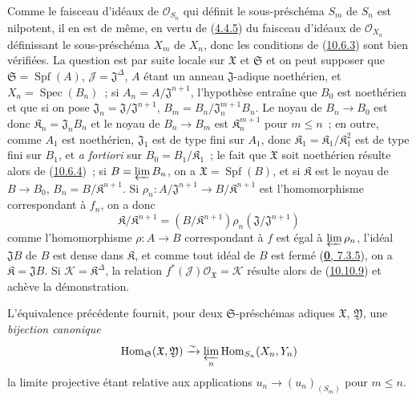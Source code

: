 Comme le faisceau d'idéaux de $\mathscr{O}_{S_n}$ qui définit le
sous-préschéma $S_m$ de $S_n$ est nilpotent, il en est de même, en vertu de
(\hyperref[I.4.4.5-fr]{4.4.5}) du faisceau d'idéaux de
$\mathscr{O}_{X_n}$ définissant le sous-préschéma $X_m$ de $X_n$, donc les
conditions de (\hyperref[I.10.6.3-fr]{10.6.3}) sont bien vérifiées. La
question est par suite locale sur $\mathfrak{X}$ et $\mathfrak{S}$ et on
peut supposer que $\mathfrak{S}=\operatorname{Spf}(A)$,
$\mathscr{J}=\mathfrak{J}^\Delta$, $A$ étant un anneau $\mathfrak{J}$-adique
noethérien, et $X_n=\operatorname{Spec}(B_n)$~; si
$A_n=A/\mathfrak{J}^{n+1}$, l'hypothèse entraîne que $B_0$ est noethérien et
que si on pose $\mathfrak{J}_n=\mathfrak{J}/\mathfrak{J}^{n+1}$,
$B_m=B_n/\mathfrak{J}_n^{m+1}B_n$. Le noyau de $B_n\to B_0$ est donc
$\mathfrak{K}_n=\mathfrak{J}_nB_n$ et le noyau de $B_n\to B_m$ est
$\mathfrak{K}_n^{m+1}$ pour $m\leq n$~; en outre, comme $A_1$ est
noethérien, $\mathfrak{J}_1$ est de type fini sur $A_1$, donc
$\mathfrak{K}_1=\mathfrak{K}_1/\mathfrak{K}_1^2$ est de type fini
sur $B_1$, et \emph{a fortiori} sur
$B_0=B_1/\mathfrak{K}_1$~; le fait que $\mathfrak{X}$ soit noethérien
résulte alors de (\hyperref[I.10.6.4-fr]{10.6.4})~; si
$B=\varprojlim B_n$, on a $\mathfrak{X}=\operatorname{Spf}(B)$, et si
$\mathfrak{K}$ est le noyau de $B\to B_0$,
$B_n=B/\mathfrak{K}^{n+1}$. Si
$\rho_n:A/\mathfrak{J}^{n+1}\to B/\mathfrak{K}^{n+1}$ est l'homomorphisme
correspondant à $f_n$, on a donc
\[
  \mathfrak{K}/\mathfrak{K}^{n+1}
  =(B/\mathfrak{K}^{n+1})\rho_n(\mathfrak{J}/\mathfrak{J}^{n+1})
\]
comme l'homomorphisme $\rho:A\to B$ correspondant à $f$ est égal à
$\varprojlim\rho_n$, l'idéal $\mathfrak{J}B$ de $B$ est dense dans
$\mathfrak{K}$, et comme tout idéal de $B$ est fermé
(\hyperref[0.7.3.5-fr]{\textbf{0}, 7.3.5}), on a $\mathfrak{K}=\mathfrak{J}B$. Si
$\mathscr{K}=\mathfrak{K}^\Delta$, la relation
$f^*(\mathscr{J})\mathscr{O}_{\mathfrak{X}}=\mathscr{K}$ résulte alors de
(\hyperref[I.10.10.9-fr]{10.10.9}) et achève la démonstration.

\begin{env}[10.12.3.2]
\label{I.10.12.3.2-fr}
L'équivalence précédente fournit, pour deux $\mathfrak{S}$-préschémas
adiques $\mathfrak{X}$, $\mathfrak{Y}$, une \emph{bijection canonique}
\[
  \operatorname{Hom}_{\mathfrak{S}}(\mathfrak{X},\mathfrak{Y})
  \xrightarrow{\sim}
  \varprojlim_n\operatorname{Hom}_{S_n}(X_n,Y_n)
\]
la limite projective étant relative aux applications
$u_n\to(u_n)_{(S_m)}$ pour $m\leq n$.
\end{env}

